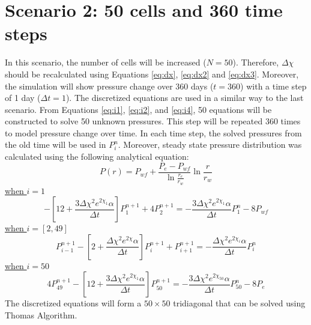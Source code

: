 \documentclass[12pt,letterpaper,titlepage]{article}
\begin{document}
\section{Scenario 2: 50 cells and 360 time steps}
In this scenario, the number of cells will be increased ($N=50$). Therefore, $\Delta\chi$ should be recalculated using Equations \ref{eq:dx}, \ref{eq:dx2} and \ref{eq:dx3}. Moreover, the simulation will show pressure change over 360 days ($t=360$) with a time step of 1 day ($\Delta t=1$). The discretized equations are used in a similar way to the last scenario. From Equations \ref{eq:i1}, \ref{eq:i2}, and \ref{eq:i4}, 50 equations will be constructed to solve 50 unknown pressures. This step will be repeated 360 times to model pressure change over time. In each time step, the solved pressures from the old time will be used in $P_i^n$. Moreover, steady state pressure distribution was calculated using the following analytical equation: \begin{equation}
P(r)=P_{wf}+\frac{P_e-P_{wf}}{\ln{\frac{r_e}{r_w}}}\ln{\frac{r}{r_w}}
\end{equation}
\underline{when $i=1$}
\begin{equation*}
-[12+\frac{3\Delta\chi^2 e^{2\chi_1}\alpha}{\Delta t}]P^{n+1}_1 + 4 P^{n+1}_2= -\frac{3\Delta\chi^2 e^{2\chi_1}\alpha}{\Delta t}P^n_1-8  P_{wf} 
\end{equation*}
\underline{when $i=[2,49]$}
\begin{equation*}
{P^{n+1}_{i-1}-[2+\frac{\Delta\chi^2e^{2\chi}\alpha}{\Delta t}]P^{n+1}_{i}+P^{n+1}_{i+1}} =-\frac{\Delta\chi^2e^{2\chi_i}\alpha}{\Delta t} P^n_i
\end{equation*}
\underline{when $i=50$}
\begin{equation*}
4 P^{n+1}_{49}-[12+\frac{3\Delta\chi^2 e^{2\chi_1}\alpha}{\Delta t}]P^{n+1}_{50} = -\frac{3\Delta\chi^2 e^{2\chi_{50}}\alpha}{\Delta t}P^n_{50}-8  P_{e} 
\end{equation*}
The discretized equations will form a $50\times50$ tridiagonal that can be solved using Thomas Algorithm.
 \renewcommand{\arraystretch}{2}
\end{document}
